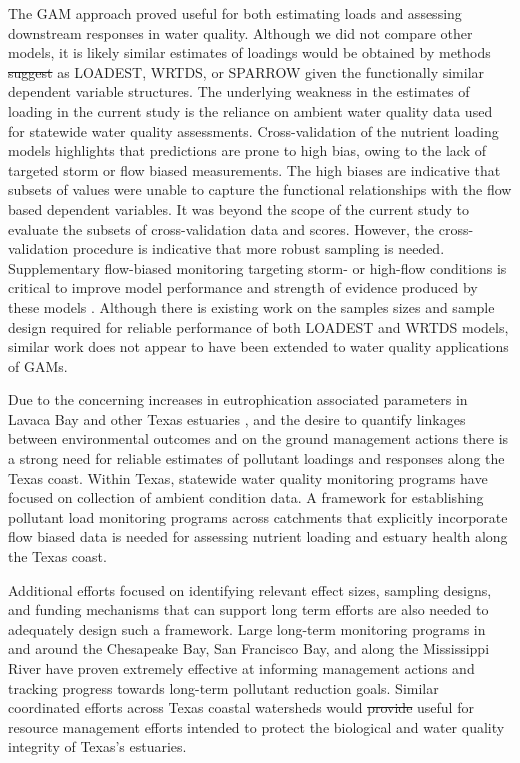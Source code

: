 \documentclass[fleqn,10pt,lineno]{wlpeerj} %
\providecommand{\DIFaddtex}[1]{{\protect\color{blue}\uwave{#1}}} %
\providecommand{\DIFdeltex}[1]{{\protect\color{red}\sout{#1}}}                      %
\providecommand{\DIFaddbegin}{} %
\providecommand{\DIFaddend}{} %
\providecommand{\DIFdelbegin}{} %
\providecommand{\DIFdelend}{} %
\providecommand{\DIFadd}[1]{\texorpdfstring{\DIFaddtex{#1}}{#1}} %
\providecommand{\DIFdel}[1]{\texorpdfstring{\DIFdeltex{#1}}{}} %
\begin{document}
The GAM approach proved useful for both estimating loads and assessing
downstream responses in water quality. Although we did not compare other
models, it is likely similar estimates of loadings would be obtained by
methods \DIFdelbegin \DIFdel{suggest }\DIFdelend \DIFaddbegin \DIFadd{such }\DIFaddend as LOADEST, WRTDS, or SPARROW given the functionally
similar dependent variable structures. The underlying weakness in the
estimates of loading in the current study is the reliance on ambient
water quality data used for statewide water quality assessments.
Cross-validation of the nutrient loading models highlights that
predictions are prone to high bias, owing to the lack of targeted storm
or flow biased measurements. The high biases are indicative that subsets
of values were unable to capture the functional relationships with the
flow based dependent variables. It was beyond the scope of the current
study to evaluate the subsets of cross-validation data and scores.
However, the cross-validation procedure is indicative that more robust
sampling is needed. Supplementary flow-biased monitoring targeting
storm- or high-flow conditions is critical to improve model performance
and strength of evidence produced by these models
\autocite{horowitzEvaluationSedimentRating2003,snelderEstimationCatchmentNutrient2017}.
Although there is existing work on the samples sizes and sample design
required for reliable performance of both LOADEST
\autocite{parkUsePollutantLoad2014} and WRTDS
\autocite{kumarValueIntensiveSampling2019} models, similar work does not
appear to have been extended to water quality applications of GAMs.

Due to the concerning increases in eutrophication associated parameters
in Lavaca Bay and other Texas estuaries \autocite{bugica_water_2020},
and the desire to quantify linkages between environmental outcomes and
on the ground management actions \autocite{schrammTotalMaximumDaily2022}
there is a strong need for reliable estimates of pollutant loadings and
responses along the Texas coast. Within Texas, statewide water quality
monitoring programs have focused on collection of ambient condition
data. A framework for establishing pollutant load monitoring programs
across catchments that explicitly incorporate flow biased data is needed
for assessing nutrient loading and estuary health along the Texas coast.

Additional efforts focused on identifying relevant effect sizes,
sampling designs, and funding mechanisms that can support long term
efforts are also needed to adequately design such a framework. Large
long-term monitoring programs in and around the Chesapeake Bay, San
Francisco Bay, and along the Mississippi River have proven extremely
effective at informing management actions and tracking progress towards
long-term pollutant reduction goals. Similar coordinated efforts across
Texas coastal watersheds would \DIFdelbegin \DIFdel{provide }\DIFdelend \DIFaddbegin \DIFadd{prove }\DIFaddend useful for resource management
efforts intended to protect the biological and water quality integrity
of Texas's estuaries.
\end{document}
